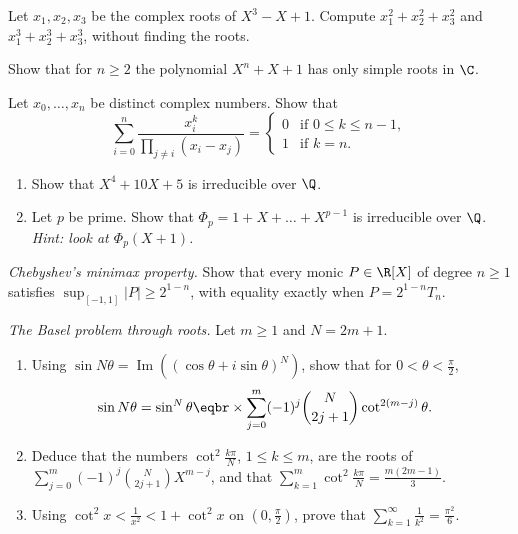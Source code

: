 \begin{exercise}[$\star$]\label{ex:viete}
Let $x_1,x_2,x_3$ be the complex roots of $X^3-X+1$. Compute $x_1^2+x_2^2+x_3^2$ and $x_1^3+x_2^3+x_3^3$, without finding the roots.
\end{exercise}

\begin{exercise}[$\star\star$]\label{ex:simple}
Show that for $n\ge2$ the polynomial $X^n+X+1$ has only simple roots in $\C$.
\end{exercise}

\begin{exercise}[$\star\star$]\label{ex:lagsum}
Let $x_0,\dots,x_n$ be distinct complex numbers. Show that
\[
\sum_{i=0}^n\frac{x_i^k}{\prod_{j\ne i}(x_i-x_j)}=\begin{cases}0&\text{if }0\le k\le n-1,\\1&\text{if }k=n.\end{cases}
\]
\end{exercise}

\begin{exercise}[$\star\star$]\label{ex:eisen}
\begin{enumerate}[label=(\alph*)]
\item Show that $X^4+10X+5$ is irreducible over $\Q$.
\item Let $p$ be prime. Show that $\Phi_p=1+X+\dots+X^{p-1}$ is irreducible over $\Q$. \emph{Hint: look at $\Phi_p(X+1)$.}
\end{enumerate}
\end{exercise}

\begin{exercise}[$\star\star\star$]\label{ex:minimax}
\emph{Chebyshev's minimax property.} Show that every monic $P\in\R[X]$ of degree $n\ge1$ satisfies
$\sup_{[-1,1]}|P|\ge2^{1-n}$, with equality exactly when $P=2^{1-n}T_n$.
\end{exercise}

\begin{exercise}[$\star\star\star$]\label{ex:basel}
\emph{The Basel problem through roots.} Let $m\ge1$ and $N=2m+1$.
\begin{enumerate}[label=(\alph*)]
\item Using $\sin N\theta=\operatorname{Im}\left((\cos\theta+i\sin\theta)^N\right)$, show that for $0<\theta<\frac\pi2$,
\[
\begin{aligned}\sin N\theta&=\sin^N\theta\eqbr\times\sum_{j=0}^m(-1)^j\binom N{2j+1}\cot^{2(m-j)}\theta.\end{aligned}
\]
\item Deduce that the numbers $\cot^2\frac{k\pi}N$, $1\le k\le m$, are the roots of $\sum_{j=0}^m(-1)^j\binom N{2j+1}X^{m-j}$, and that
$\displaystyle\sum_{k=1}^m\cot^2\frac{k\pi}N=\frac{m(2m-1)}3$.
\item Using $\cot^2x<\frac1{x^2}<1+\cot^2x$ on $\left(0,\frac\pi2\right)$, prove that $\displaystyle\sum_{k=1}^\infty\frac1{k^2}=\frac{\pi^2}6$.
\end{enumerate}
\end{exercise}

